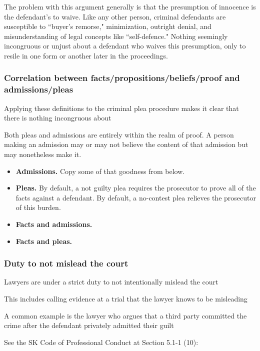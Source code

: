 The problem with this argument generally is that the presumption of innocence is the defendant's to waive. Like any other person, criminal defendants are susceptible to ``buyer's remorse," minimization, outright denial, and misunderstanding of legal concepts like ``self-defence." Nothing seemingly incongruous or unjust about a defendant who waives this presumption, only to resile in one form or another later in the proceedings.

\subsubsection{Correlation between facts/propositions/beliefs/proof and admissions/pleas}

Applying these definitions to the criminal plea procedure makes it clear that there is nothing incongruous about 

Both pleas and admissions are entirely within the realm of proof. A person making an admission may or may not believe the content of that admission but may nonetheless make it. 

\begin{itemize}
    \item \textbf{Admissions.} Copy some of that goodness from below.
    \item \textbf{Pleas.} By default, a not guilty plea requires the prosecutor to prove all of the facts against a defendant. By default, a no-contest plea relieves the prosecutor of this burden.
    \item \textbf{Facts and admissions.} 
    \item \textbf{Facts and pleas.}
\end{itemize}

\subsubsection{Duty to not mislead the court}

Lawyers are under a strict duty to not intentionally mislead the court

This includes calling evidence at a trial that the lawyer knows to be misleading

A common example is the lawyer who argues that a third party committed the crime after the defendant privately admitted their guilt

See the SK Code of Professional Conduct at Section 5.1-1 (10):


